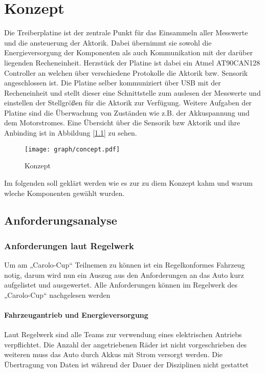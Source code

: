 
\chapter{Konzept}

Die Treiberplatine ist der zentrale Punkt für das Einsammeln aller Messwerte und die ansteuerung der Aktorik. Dabei übernimmt sie sowohl die Energieversorgung der Komponenten als auch
Kommunikation mit der darüber liegenden Recheneinheit. Herzstück der Platine ist dabei ein Atmel AT90CAN128 \textmu Controller an welchen über verschiedene Protokolle die Aktorik bzw. Sensorik
angeschlossen ist. Die Platine selber kommuniziert über USB mit der Recheneinheit und stellt dieser eine Schnittstelle zum auslesen der Messwerte und einstellen der Stellgrößen für die Aktorik
zur Verfügung. Weitere Aufgaben der Platine sind die Überwachung von Zuständen wie z.B. der Akkuspannung und dem Motorstromes. Eine Übersicht über die Sensorik bzw Aktorik und ihre Anbinding ist in 
Abbildung [\ref{fig:konzept}] zu sehen.

\begin{figure}[H]
\centering
\texttt{[image: graph/concept.pdf]}\\
\caption{Konzept}
\label{fig:konzept}
\end{figure}

Im folgenden soll geklärt werden wie es zur zu diem Konzept kahm und warum wleche Komponenten gewählt wurden.


\section{Anforderungsanalyse}

\subsection{Anforderungen laut Regelwerk}
Um am „Carolo-Cup“ Teilnemen zu können ist ein Regelkonformes Fahrzeug notig, darum wird nun ein Auszug aus den Anforderungen an das Auto kurz aufgelistet und ausgewertet.
Alle Anforderungen können im Regelwerk des „Carolo-Cup“ nachgelesen werden \cite{website-carolo-cup-regelwerk}


\subsubsection{Fahrzeugantrieb und Energieversorgung}
Laut Regelwerk sind alle Teams zur verwendung eines elektrischen Antriebs verpflichtet.
Die Anzahl der angetriebenen Räder ist nicht vorgeschrieben
des weiteren muss das Auto durch Akkus mit Strom versorgt werden.
Die Übertragung von Daten ist während der Dauer der Disziplinen nicht gestattet

